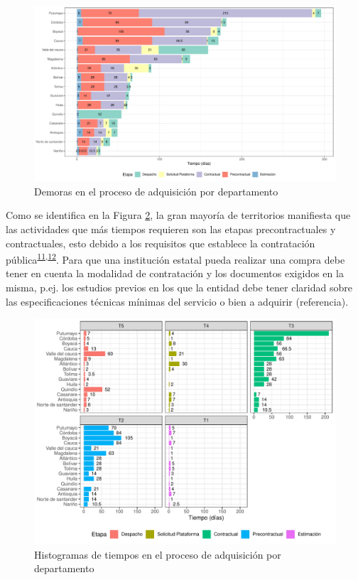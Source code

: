 \documentclass[
]{book}
\begin{document}
\begin{figure}
\includegraphics[width=1\linewidth]{InformeFinal_files/figure-latex/EtapasProcesoAdquisicion-1} \caption{Demoras en el proceso de adquisición por departamento}\label{fig:EtapasProcesoAdquisicion}
\end{figure}

Como se identifica en la Figura \ref{fig:EtapasProcesoAdquisicionDetalle}, la gran mayoría de territorios manifiesta que las actividades que más tiempos requieren son las etapas precontractuales y contractuales, esto debido a los requisitos que establece la contratación pública\textsuperscript{\protect\hyperlink{ref-CongresodelaRepublicadeColombia1993}{11},\protect\hyperlink{ref-CongresodelaRepublicadeColombia2007}{12}}. Para que una institución estatal pueda realizar una compra debe tener en cuenta la modalidad de contratación y los documentos exigidos en la misma, p.ej. los estudios previos en los que la entidad debe tener claridad sobre las especificaciones técnicas mínimas del servicio o bien a adquirir (referencia).

\begin{figure}
\includegraphics[width=0.95\linewidth]{InformeFinal_files/figure-latex/EtapasProcesoAdquisicionDetalle-1} \caption{Histogramas de tiempos en el proceso de adquisición por departamento}\label{fig:EtapasProcesoAdquisicionDetalle}
\end{figure}
\end{document}
